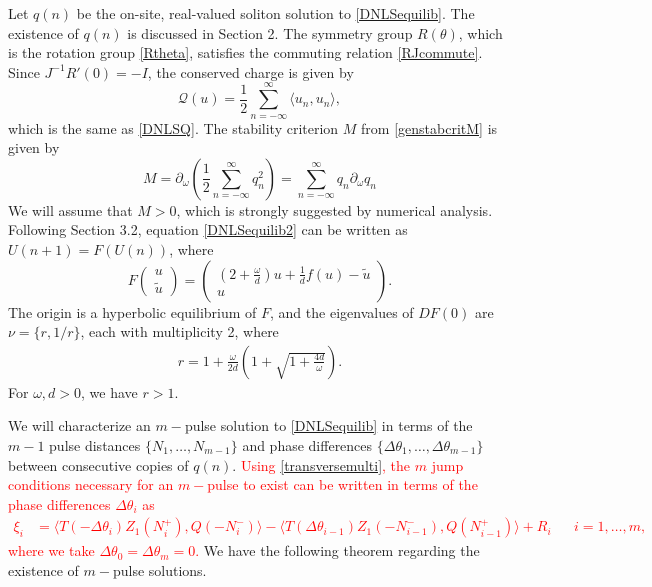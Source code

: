 \documentclass[12pt]{elsarticle}
\newcommand{\revised}[1]{ \textcolor{red}{#1} }
\begin{document}
Let $q(n)$ be the on-site, real-valued soliton solution to \cref{DNLSequilib}. The existence of $q(n)$ is discussed in Section 2. The symmetry group $R(\theta)$, which is the rotation group \eqref{Rtheta}, satisfies the commuting relation \eqref{RJcommute}. Since $J^{-1}R'(0) = -I$, the conserved charge is given by 
\begin{equation}\label{DNLSQ2}
\mathcal{Q}(u) = \frac{1}{2} \sum_{n = -\infty}^\infty 
\langle u_n, u_n \rangle,
\end{equation}
which is the same as \eqref{DNLSQ}. The stability criterion $M$ from \eqref{genstabcritM} is given by
\begin{equation}\label{DNLSM}
M = \partial_\omega \left( \frac{1}{2} \sum_{n=-\infty}^\infty q_n^2 \right) = \sum_{n=-\infty}^\infty q_n \partial_\omega q_n
\end{equation}
We will assume that $M > 0$, which is strongly suggested by numerical analysis. Following Section 3.2, equation \eqref{DNLSequilib2} can be written as $U(n+1) = F(U(n))$, where
\begin{equation}\label{DNLSF}
F\begin{pmatrix}u \\ \tilde{u} \end{pmatrix} =
\begin{pmatrix}
\left( 2 + \frac{\omega}{d} \right)u + \frac{1}{d}f(u) - \tilde{u} \\
u
\end{pmatrix}.
\end{equation}
The origin is a hyperbolic equilibrium of $F$, and the eigenvalues of $DF(0)$ are $\nu = \{r, 1/r\}$, each with multiplicity 2, where
\begin{align}\label{eigr}
r = 1 + \frac{\omega}{2 d} \left( 1 + \sqrt{1 + \frac{4 d}{\omega}} \right).
\end{align}
For $\omega, d > 0$, we have $r > 1$. 

We will characterize an $m-$pulse solution to \cref{DNLSequilib} in terms of the $m-1$ pulse distances $\{ N_1, \dots, N_{m-1} \}$ and phase differences $\{ \Delta\theta_1, \dots, \Delta\theta_{m-1} \}$ between consecutive copies of $q(n)$. \revised{Using \cref{transversemulti}, the $m$ jump conditions necessary for an $m-$pulse to exist can be written in terms of the phase differences $\Delta \theta_i$ as
\begin{align}\label{jumpDNLS1}
\xi_i &= \langle T(-\Delta \theta_i) Z_1(N_i^+), Q(-N_i^-) \rangle
- \langle T(\Delta \theta_{i-1}) Z_1(-N_{i-1}^-), Q(N_{i-1}^+) \rangle + R_i && i = 1, \dots, m,
\end{align}
where we take $\Delta \theta_0 = \Delta \theta_m = 0$.} We have the following theorem regarding the existence of $m-$pulse solutions. 
\end{document}
